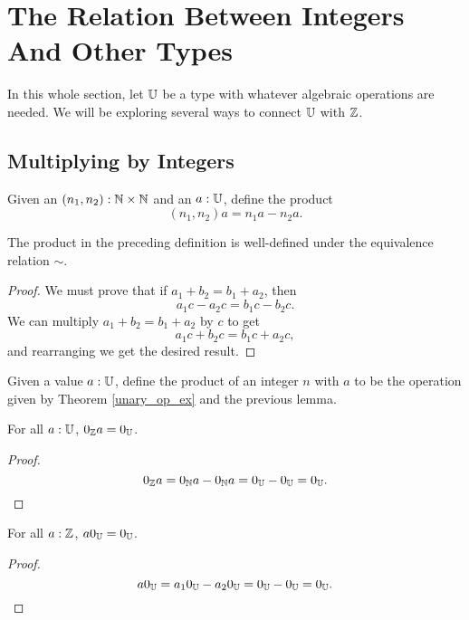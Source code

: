 \documentclass[../../math.tex]{subfiles}
\begin{document}
\section{The Relation Between Integers And Other Types}

In this whole section, let $\mathbb{U}$ be a type with whatever algebraic operations are
needed.  We will be exploring several ways to connect $\mathbb{U}$ with $\mathbb{Z}$.

\subsection{Multiplying by Integers}

\begin{definition}
    Given an $(n_1, n_2) : \mathbb{N} \times \mathbb{N}$ and an $a : \mathbb{U}$, define the product
    \[
        (n_1, n_2)a = n_1a - n_2a.
    \]
\end{definition}

\begin{lemma}
    The product in the preceding definition is well-defined under the
    equivalence relation $\sim$.
\end{lemma}
\begin{proof}
    We must prove that if $a_1 + b_2 = b_1 + a_2$, then
    \[
        a_1c - a_2c = b_1c - b_2c.
    \]
    We can multiply $a_1 + b_2 = b_1 + a_2$ by $c$ to get
    \[
        a_1c + b_2c = b_1c + a_2c,
    \]
    and rearranging we get the desired result.
\end{proof}

\begin{definition}
    Given a value $a : \mathbb{U}$, define the product of an integer $n$ with $a$ to be
    the operation given by Theorem \ref{unary_op_ex} and the previous lemma.
\end{definition}

\begin{theorem}
    For all $a : \mathbb{U}$, $0_{\mathbb{Z}} a = 0_{\mathbb{U}}$.
\end{theorem}
\begin{proof}
    \[
        0_{\mathbb{Z}} a = 0_{\mathbb{N}} a - 0_{\mathbb{N}} a = 0_{\mathbb{U}} - 0_{\mathbb{U}} = 0_{\mathbb{U}}.
    \]
\end{proof}

\begin{theorem}
    For all $a : \mathbb{Z}$, $a0_{\mathbb{U}} = 0_{\mathbb{U}}$.
\end{theorem}
\begin{proof}
    \[
        a0_{\mathbb{U}} = a_10_{\mathbb{U}} - a_20_{\mathbb{U}} = 0_{\mathbb{U}} - 0_{\mathbb{U}} = 0_{\mathbb{U}}.
    \]
\end{proof}
\end{document}
